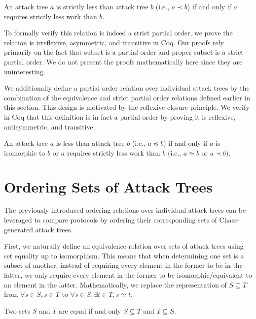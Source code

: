 \documentclass[runningheads]{llncs}
\theoremstyle{definition}
\begin{document}
\begin{definition}
    An attack tree $a$ is strictly less than attack tree $b$ (i.e., $a \prec b$) if and only if $a$ requires strictly less work than $b$.
\end{definition}

To formally verify this relation is indeed a strict partial order, we prove the relation is irreflexive, asymmetric, and transitive in Coq. Our proofs rely primarily on the fact that subset is a partial order and proper subset is a strict partial order. We do not present the proofs mathematically here since they are uninteresting.

We additionally define a partial order relation over individual attack trees by the combination of the equivalence and strict partial order relations defined earlier in this section. This design is motivated by the reflexive closure principle. We verify in Coq that this definition is in fact a partial order by proving it is reflexive, antisymmetric, and transitive.

\begin{definition}
  An attack tree $a$ is less than attack tree $b$ (i.e., $a \preceq b$) if and only if $a$ is isomorphic to $b$ or $a$ requires strictly less work than $b$ (i.e., $a \simeq b$ or $a \prec b$).
\end{definition}


\section{Ordering Sets of Attack Trees}

The previously introduced ordering relations over individual attack trees can be leveraged to compare protocols by ordering their corresponding sets of Chase-generated attack trees. 

First, we naturally define an equivalence relation over sets of attack trees using set equality up to isomorphism. This means that when determining one set is a subset of another, instead of requiring every element in the former to be in the latter, we only require every element in the former to be isomorphic/equivalent to an element in the latter. Mathematically, we replace the representation of $S \subseteq T$ from $\forall s \in S, s \in T$ to $\forall s \in S, \exists t \in T, s \simeq t$.

\begin{definition}
  Two sets $S$ and $T$ are equal if and only $S \subseteq T$ and $T \subseteq S$.
\end{definition}
\end{document}
